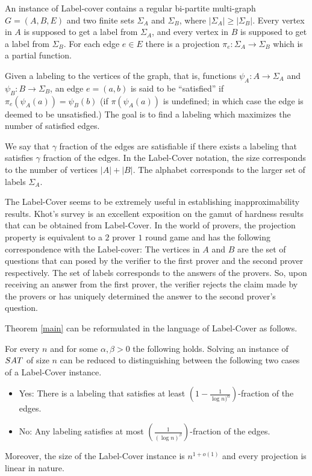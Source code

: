 \begin{definition}\label{label} An instance of {\sc Label-cover}
  contains a regular bi-partite multi-graph $G = (A, B, E)$ and two
  finite sets $\Sigma_A$ and $\Sigma_B$, where $|\Sigma_A| \ge
  |\Sigma_B|$.  Every vertex in $A$ is supposed to get a label from
  $\Sigma_A$, and every vertex in $B$ is supposed to get a label from
  $\Sigma_B$. For each edge $e \in E$ there is a projection $\pi_e:
  \Sigma_A \rightarrow \Sigma_B$ which is a partial function.

Given a labeling to the vertices of the graph, that is, functions
$\psi_A:A \rightarrow \Sigma_A$ and $\psi_B:B \rightarrow \Sigma_B$,
an edge $e =(a,b)$ is said to be ``satisfied'' if $\pi_e(\psi_A(a)) =
\psi_B(b)$ (if $\pi(\psi_A(a))$ is undefined; in which case the edge
is deemed to be unsatisfied.) The goal is to find a labeling which
maximizes the number of satisfied edges.
\end{definition} 

We say that $\gamma$ fraction of the edges are satisfiable if there
exists a labeling that satisfies $\gamma$ fraction of the edges. In
the {\sc Label-Cover} notation, the size corresponds to the number of
vertices $|A| + |B|$. The alphabet corresponds to the larger set of
labels $\Sigma_A$.

The {\sc Label-Cover} seems to be extremely useful in establishing
inapproximability results. Khot's survey \cite{LongCodeSurvey} is an
excellent exposition on the gamut of hardness results that can be obtained
from {\sc Label-Cover}.  In the world of provers, the projection
property is equivalent to a $2$ prover $1$ round game and has the
following correspondence with the {\sc Label-cover}: The vertices in
$A$ and $B$ are the set of questions that can posed by the verifier to
the first prover and the second prover respectively. The set of labels
corresponds to the answers of the provers. So, upon receiving an
answer from the first prover, the verifier rejects the claim made by
the provers or has uniquely determined the answer to the second
prover's question.


Theorem \ref{main} can be reformulated in the language of {\sc
  Label-Cover} as follows.

\begin{corollary}\label{oldcover}
  For every $n$ and for some $\alpha, \beta > 0$ the following
  holds. Solving an instance of ${\sc SAT}$ of size $n$ can be reduced
  to distinguishing between the following two cases of a {\sc
    Label-Cover} instance.
\begin{itemize}
\item {\sf Yes:} There is a labeling that satisfies at least $(1 -
  \frac{1}{\log n)^\alpha})$-fraction of the edges.
\item {\sf No:} Any labeling satisfies at most $(\frac{1}{(\log n)^\beta})$-fraction of the edges.
\end{itemize}
Moreover, the size of the {\sc Label-Cover} instance is $n^{1 + o(1)}$
and every projection is linear in nature.
\end{corollary}


